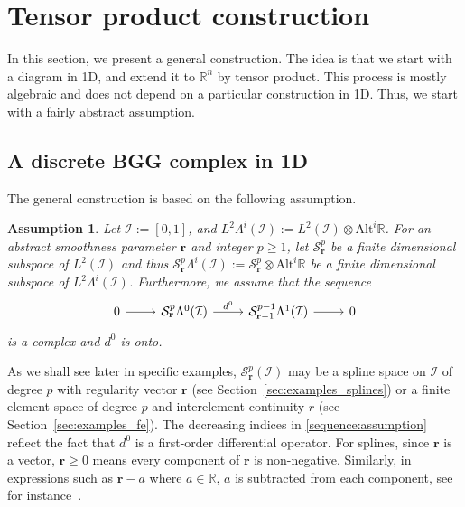 \documentclass[final]{amsart}%
\newtheorem{assumption}{Assumption}
\newcommand{\0}{\mathaccent23}
\newcommand \alt{\mathrm{Alt}}
\newcommand{\br}{\mathbf r}
\begin{document}
\section{Tensor product construction}
\label{sec:construction}


In this section, we present a general construction. The idea is that we start with a diagram in 1D, and extend it to $\mathbb R^n$ by tensor product. This process is mostly algebraic and does not depend on a particular construction in 1D. Thus, we start with a fairly abstract assumption.

\subsection{A discrete BGG complex in 1D}

The general construction is based on the following assumption.
\begin{assumption}
\label{assump:1Dcomplex}
Let $\mathcal{I}:=[0, 1]$, and $L^2\Lambda^i(\mathcal{I}):=L^2(\mathcal{I})\otimes \alt^i\mathbb{R}$.
For an abstract smoothness parameter $\br$ and integer $p\geq 1$,  let $\mathcal{S}_{\br}^{p}$ be a finite dimensional subspace of $L^2(\mathcal{I})$ and thus $\mathcal{S}_{\br}^{p}\Lambda^i(\mathcal{I}):=\mathcal{S}_{\br}^{p}\otimes\alt^i\mathbb{R}$ be a finite dimensional subspace of $L^2\Lambda^i(\mathcal{I})$. Furthermore, we assume that the sequence 
\begin{equation}
\label{sequence:assumption} 
\begin{tikzcd}
0 \arrow{r}&\mathcal{S}_{\br}^{p}\Lambda^0(\mathcal{I}) \arrow{r}{d^{0}}& \mathcal{S}_{\br-1}^{p-1}\Lambda^1 (\mathcal{I})\arrow{r}{}&0
\end{tikzcd}
\end{equation} 
is a complex and $d^0$ is onto.
\end{assumption}

As we shall see later in specific examples, $\mathcal{S}_{\br}^{p}(\mathcal{I})$ may be a spline space on $\mathcal{I}$ of degree $p$ with regularity vector $\br$ (see Section~\ref{sec:examples_splines}) or a finite element space of degree $p$ and interelement continuity $r$ (see Section~\ref{sec:examples_fe}). The decreasing indices in \eqref{sequence:assumption} reflect the fact that $d^0$ is a first-order differential operator. For splines, since $\br$ is a vector, $\br\ge 0$ means every component of $\br$ is non-negative. Similarly, in expressions such as $\br-a$ where $a\in \mathbb{R}$, $a$ is subtracted from each component, see for instance~\cite[p.821]{buffa2011isogeometric}. 
\end{document}
